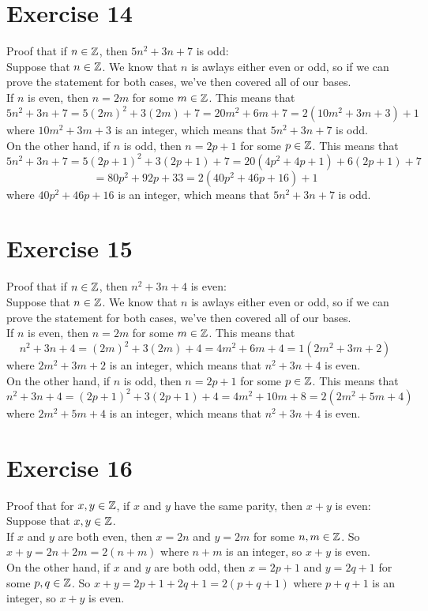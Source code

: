 \documentclass[12pt]{article}
\begin{document}
    \section*{Exercise 14}
    Proof that if $n \in \mathbb{Z}$,
    then $5n^2 + 3n + 7$ is odd: \\
    Suppose that $n \in \mathbb{Z}$.
    We know that $n$ is awlays either even or odd,
    so if we can prove the statement for both cases,
    we've then covered all of our bases. \\
    If $n$ is even,
    then $n = 2m$ for some $m \in \mathbb{Z}$.
    This means that 
    \[ 5n^2 + 3n + 7 = 5(2m)^2 + 3(2m) + 7 = 20m^2 + 6m + 7
    = 2(10m^2 + 3m + 3) + 1 \]
    where $10m^2 + 3m + 3$ is an integer,
    which means that $5n^2 + 3n + 7$ is odd. \\
    On the other hand, if $n$ is odd,
    then $n = 2p + 1$ for some $p \in \mathbb{Z}$.
    This means that 
    \[ 5n^2 + 3n + 7 = 5(2p+1)^2 + 3(2p+1) + 7
    = 20(4p^2 + 4p + 1) + 6(2p+1) + 7 \]
    \[ = 80p^2 + 92p + 33
    = 2(40p^2 + 46p + 16) + 1 \]
    where $40p^2 + 46p + 16$ is an integer,
    which means that $5n^2 + 3n + 7$ is odd. \\

    \section*{Exercise 15}
    Proof that if $n \in \mathbb{Z}$,
    then $n^2 + 3n + 4$ is even: \\
    Suppose that $n \in \mathbb{Z}$.
    We know that $n$ is awlays either even or odd,
    so if we can prove the statement for both cases,
    we've then covered all of our bases. \\
    If $n$ is even,
    then $n = 2m$ for some $m \in \mathbb{Z}$.
    This means that 
    \[ n^2 + 3n + 4 = (2m)^2 + 3(2m) + 4 = 4m^2 + 6m + 4
    = 1(2m^2 + 3m + 2) \]
    where $2m^2 + 3m + 2$ is an integer,
    which means that $n^2 + 3n + 4$ is even. \\
    On the other hand, if $n$ is odd,
    then $n = 2p + 1$ for some $p \in \mathbb{Z}$.
    This means that 
    \[ n^2 + 3n + 4 = (2p+1)^2 + 3(2p+1) + 4 = 4m^2 + 10m + 8
    = 2(2m^2 + 5m + 4) \]
    where $2m^2 + 5m + 4$ is an integer,
    which means that $n^2 + 3n + 4$ is even. \\

    \section*{Exercise 16}
    Proof that for $x, y \in \mathbb{Z}$,
    if $x$ and $y$ have the same parity,
    then $x+y$ is even: \\
    Suppose that $x, y \in \mathbb{Z}$. \\
    If $x$ and $y$ are both even,
    then $x = 2n$ and $y=2m$ for some $n, m \in \mathbb{Z}$.
    So $x+y = 2n + 2m = 2(n+m)$
    where $n+m$ is an integer,
    so $x+y$ is even. \\
    On the other hand, 
    if $x$ and $y$ are both odd,
    then $x = 2p+1$ and $y=2q+1$ for some $p, q \in \mathbb{Z}$.
    So $x+y = 2p+1 + 2q+1 = 2(p+q+1)$
    where $p+q+1$ is an integer,
    so $x+y$ is even. \\
\end{document}

